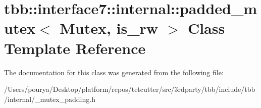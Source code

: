 \hypertarget{classtbb_1_1interface7_1_1internal_1_1padded__mutex}{}\section{tbb\+:\+:interface7\+:\+:internal\+:\+:padded\+\_\+mutex$<$ Mutex, is\+\_\+rw $>$ Class Template Reference}
\label{classtbb_1_1interface7_1_1internal_1_1padded__mutex}


The documentation for this class was generated from the following file\+:\begin{DoxyCompactItemize}
\item 
/\+Users/pourya/\+Desktop/platform/repos/tetcutter/src/3rdparty/tbb/include/tbb/internal/\+\_\+mutex\+\_\+padding.\+h\end{DoxyCompactItemize}
